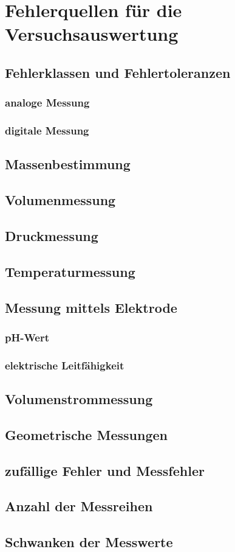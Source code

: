 \section{Fehlerquellen für die Versuchsauswertung}

\subsection{Fehlerklassen und Fehlertoleranzen}
\subsubsection{analoge Messung}
\subsubsection{digitale Messung}

\subsection{Massenbestimmung}

\subsection{Volumenmessung}

\subsection{Druckmessung}

\subsection{Temperaturmessung}

\subsection{Messung mittels Elektrode}
\subsubsection{pH-Wert}
\subsubsection{elektrische Leitfähigkeit}

\subsection{Volumenstrommessung}

\subsection{Geometrische Messungen}

\subsection{zufällige Fehler und Messfehler}

\subsection{Anzahl der Messreihen}

\subsection{Schwanken der Messwerte}
